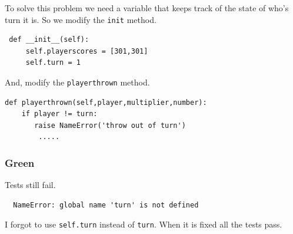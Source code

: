 \documentclass{beamer}
\begin{document}
\begin{frame}[fragile]
 To solve this problem we need a variable that keeps track of the
 state of who's turn it is. So we modify the {\tt init} method.
 \begin{lstlisting}
 def __init__(self):
     self.playerscores = [301,301]
     self.turn = 1
 \end{lstlisting}
And, modify the {\tt playerthrown} method. 
\begin{lstlisting}
def playerthrown(self,player,multiplier,number):
    if player != turn:
       raise NameError('throw out of turn')
        .....
\end{lstlisting}
\end{frame}
\begin{frame}[fragile]
\frametitle{Green}
Tests still fail. 
\begin{verbatim}
  NameError: global name 'turn' is not defined
\end{verbatim}
I forgot to use {\tt self.turn} instead of {\tt turn}. When it is
fixed all the tests pass.
\end{frame}
\end{document}
